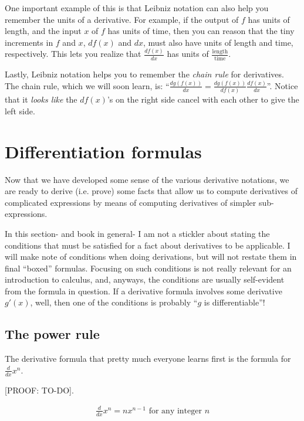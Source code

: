 One important example of this is that Leibniz notation can also help you remember the units of a derivative. For example, if the output of $f$ has units of length, and the input $x$ of $f$ has units of time, then you can reason that the tiny increments in $f$ and $x$, $df(x)$ and $dx$, must also have units of length and time, respectively. This lets you realize that $\frac{df(x)}{dx}$ has units of $\frac{\text{length}}{\text{time}}$.
         
Lastly, Leibniz notation helps you to remember the \textit{chain rule} for derivatives. The chain rule, which we will soon learn, is: ``$\frac{dg(f(x))}{dx} = \frac{dg(f(x))}{df(x)} \frac{df(x)}{dx}$''. Notice that it \textit{looks like} the $df(x)$'s on the right side cancel with each other to give the left side.
         
\section*{Differentiation formulas}

Now that we have developed some sense of the various derivative notations, we are ready to derive (i.e. prove) some facts that allow us to compute derivatives of complicated expressions by means of computing derivatives of simpler sub-expressions.

In this section- and book in general- I am not a stickler about stating the conditions that must be satisfied for a fact about derivatives to be applicable. I will make note of conditions when doing derivations, but will not restate them in final ``boxed'' formulas. Focusing on such conditions is not really relevant for an introduction to calculus, and, anyways, the conditions are usually self-evident from the formula in question. If a derivative formula involves some derivative $g'(x)$, well, then one of the conditions is probably ``$g$ is differentiable''!

\subsection*{The power rule}

The derivative formula that pretty much everyone learns first is the formula for $\frac{d}{dx} x^n$.

[PROOF: TO-DO].

\begin{align*}
    \frac{d}{dx} x^n = nx^{n - 1} \text{ for any integer $n$}
\end{align*}

